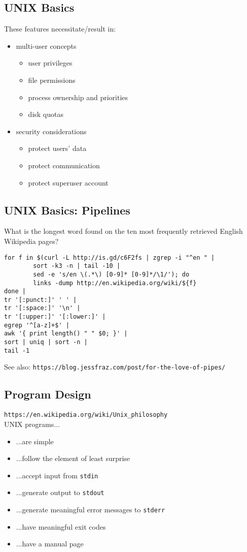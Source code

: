 \documentclass[xga]{xdvislides}
\begin{document}
\subsection{UNIX Basics}
These features necessitate/result in:
\begin{itemize}
	\item multi-user concepts
		\begin{itemize}
			\item user privileges
			\item file permissions
			\item process ownership and priorities
			\item disk quotas
		\end{itemize}
	\item security considerations
		\begin{itemize}
			\item protect users' data
			\item protect communication
			\item protect superuser account
		\end{itemize}
\end{itemize}

\subsection{UNIX Basics: Pipelines}
What is the longest word found on the ten most
frequently retrieved English Wikipedia pages?
\begin{verbatim}
for f in $(curl -L http://is.gd/c6F2fs | zgrep -i "^en " |
        sort -k3 -n | tail -10 |
        sed -e 's/en \(.*\) [0-9]* [0-9]*/\1/'); do
        links -dump http://en.wikipedia.org/wiki/${f}
done |
tr '[:punct:]' ' ' |
tr '[:space:]' '\n' |
tr '[:upper:]' '[:lower:]' |
egrep '^[a-z]+$' |
awk '{ print length() " " $0; }' |
sort | uniq | sort -n |
tail -1
\end{verbatim}

See also: \verb+https://blog.jessfraz.com/post/for-the-love-of-pipes/+

\subsection{Program Design}
\verb+https://en.wikipedia.org/wiki/Unix_philosophy+ \\

UNIX programs...
\begin{itemize}
	\item ...are simple
	\item ...follow the element of least surprise
	\item ...accept input from {\tt stdin}
	\item ...generate output to {\tt stdout}
	\item ...generate meaningful error messages to {\tt stderr}
	\item ...have meaningful exit codes
	\item ...have a manual page
\end{itemize}
\end{document}
